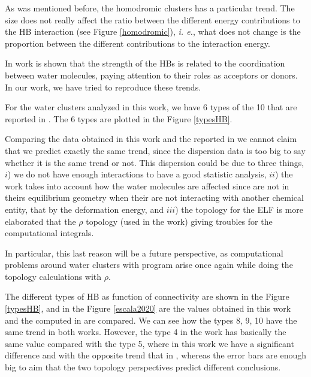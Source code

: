 As was mentioned before, the homodromic clusters has a particular trend. The
size does not really affect the ratio between the different energy
contributions to the HB interaction (see Figure \ref{homodromic}), \textit{i.
e.}, what does not change is the proportion between the different contributions
to the interaction energy.

In \citet{Castor2020} work is shown that 
the strength of the HBs is related to the coordination between water molecules,
paying attention to their roles as acceptors or donors. In our work, we have
tried to reproduce these trends.

For the water clusters analyzed in this work, we have 6 types of the 10 that
are reported in . The 6 types are plotted in the Figure
\ref{typesHB}.

Comparing the data obtained in this work and the reported in 
we cannot claim that we predict exactly the same trend, since the dispersion
data is too big to say whether it is the same trend or not. This dispersion could
be due to three things, $i$) we do not have enough interactions to
have a good statistic analysis, $ii$) the  work takes into
account how the water molecules are affected since are not in theirs
equilibrium geometry when their are not interacting with another chemical
entity, that by the deformation energy, and $iii$) the topology for the ELF is
more elaborated that the $\rho$ topology (used in the 
work) giving troubles for the computational integrals.

In particular, this last reason will be a future perspective, as computational
problems around water clusters with {} program arise once again
while doing the topology calculations with $\rho$.

\newpage

The different types of HB as function of connectivity are shown in the Figure
\ref{typesHB}, and in the Figure \ref{escala2020} are the values obtained in
this work and the computed in  are compared.  We can see
how the types 8, 9, 10 have the same trend in both works. However, the type 4
in the work  has basically the same value compared with the
type 5, where in this work we have a significant difference and with the
opposite trend that in , whereas the error bars are enough
big to aim that the two topology perspectives predict different conclusions.

